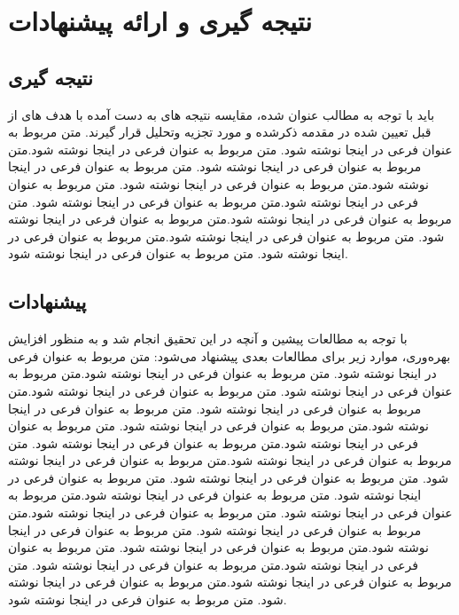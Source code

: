 \chapter{نتیجه گیری و ارائه پیشنهادات}

\section{نتیجه گیری}
  باید با توجه به مطالب عنوان شده، مقایسه نتیجه های به دست آمده با هدف های از قبل تعیین شده در مقدمه  ذکرشده و مورد تجزیه وتحلیل قرار گیرند. متن مربوط به عنوان فرعی در اینجا نوشته شود. متن مربوط به عنوان فرعی در اینجا نوشته شود.متن مربوط به عنوان فرعی در اینجا نوشته شود. متن مربوط به عنوان فرعی در اینجا نوشته شود.متن مربوط به عنوان فرعی در اینجا نوشته شود. متن مربوط به عنوان فرعی در اینجا نوشته شود.متن مربوط به عنوان فرعی در اینجا نوشته شود. متن مربوط به عنوان فرعی در اینجا نوشته شود.متن مربوط به عنوان فرعی در اینجا نوشته شود. متن مربوط به عنوان فرعی در اینجا نوشته شود.متن مربوط به عنوان فرعی در اینجا نوشته شود. متن مربوط به عنوان فرعی در اینجا نوشته شود.
  
  \section{پیشنهادات }
   با توجه به مطالعات پیشین و آنچه در این تحقیق انجام شد و به منظور افزایش بهره‌وری، موارد زیر برای مطالعات بعدی پیشنهاد می‌شود: متن مربوط به عنوان فرعی در اینجا نوشته شود. متن مربوط به عنوان فرعی در اینجا نوشته شود.متن مربوط به عنوان فرعی در اینجا نوشته شود. متن مربوط به عنوان فرعی در اینجا نوشته شود.متن مربوط به عنوان فرعی در اینجا نوشته شود. متن مربوط به عنوان فرعی در اینجا نوشته شود.متن مربوط به عنوان فرعی در اینجا نوشته شود. متن مربوط به عنوان فرعی در اینجا نوشته شود.متن مربوط به عنوان فرعی در اینجا نوشته شود. متن مربوط به عنوان فرعی در اینجا نوشته شود.متن مربوط به عنوان فرعی در اینجا نوشته شود. متن مربوط به عنوان فرعی در اینجا نوشته شود. متن مربوط به عنوان فرعی در اینجا نوشته شود. متن مربوط به عنوان فرعی در اینجا نوشته شود.متن مربوط به عنوان فرعی در اینجا نوشته شود. متن مربوط به عنوان فرعی در اینجا نوشته شود.متن مربوط به عنوان فرعی در اینجا نوشته شود. متن مربوط به عنوان فرعی در اینجا نوشته شود.متن مربوط به عنوان فرعی در اینجا نوشته شود. متن مربوط به عنوان فرعی در اینجا نوشته شود.متن مربوط به عنوان فرعی در اینجا نوشته شود. متن مربوط به عنوان فرعی در اینجا نوشته شود.متن مربوط به عنوان فرعی در اینجا نوشته شود. متن مربوط به عنوان فرعی در اینجا نوشته شود.
